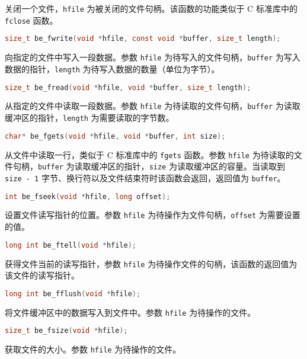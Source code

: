 关闭一个文件，\texttt{hfile} 为被关闭的文件句柄。该函数的功能类似于 C 标准库中的 \texttt{fclose} 函数。


\begin{lstlisting}[language=c, numbers=none]
size_t be_fwrite(void *hfile, const void *buffer, size_t length);
\end{lstlisting}

向指定的文件中写入一段数据。参数 \texttt{hfile} 为待写入的文件句柄，\texttt{buffer} 为写入数据的指针，\texttt{length} 为待写入数据的数量（单位为字节）。


\begin{lstlisting}[language=c, numbers=none]
size_t be_fread(void *hfile, void *buffer, size_t length);
\end{lstlisting}

从指定的文件中读取一段数据。参数 \texttt{hfile} 为待读取的文件句柄，\texttt{buffer} 为读取缓冲区的指针，\texttt{length} 为需要读取的字节数。


\begin{lstlisting}[language=c, numbers=none]
char* be_fgets(void *hfile, void *buffer, int size);
\end{lstlisting}

从文件中读取一行，类似于 C 标准库中的 \texttt{fgets} 函数。参数 \texttt{hfile} 为待读取的文件句柄，\texttt{buffer} 为读取缓冲区的指针，\texttt{size} 为读取缓冲区的容量。当读取到 \texttt{size - 1} 字节、换行符以及文件结束符时该函数会返回，返回值为 \texttt{buffer}。


\begin{lstlisting}[language=c, numbers=none]
int be_fseek(void *hfile, long offset);
\end{lstlisting}

设置文件读写指针的位置。参数 \texttt{hfile} 为待操作为文件句柄，\texttt{offset} 为需要设置的值。


\begin{lstlisting}[language=c, numbers=none]
long int be_ftell(void *hfile);
\end{lstlisting}

获得文件当前的读写指针，参数 \texttt{hfile} 为待操作文件的句柄，该函数的返回值为该文件的读写指针。


\begin{lstlisting}[language=c, numbers=none]
long int be_fflush(void *hfile);
\end{lstlisting}

将文件缓冲区中的数据写入到文件中。参数 \texttt{hfile} 为待操作的文件。


\begin{lstlisting}[language=c, numbers=none]
size_t be_fsize(void *hfile);
\end{lstlisting}

获取文件的大小。参数 \texttt{hfile} 为待操作的文件。
